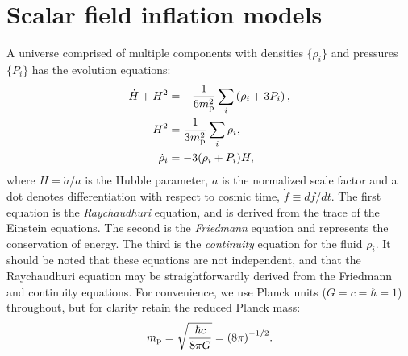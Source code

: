 \section{Scalar field inflation models}
\label{sec:Scalar_field_inflation_models}
%
A universe comprised of multiple components  with densities
$\{\rho_i\}$ and pressures $\{P_i\}$ has the evolution equations:
%
\begin{align}
  \dot{H}+H^2 &= 
  -\frac{1}{6m_{\mathrm{p}}^2}\sum\limits_i\left( \rho_i + 3P_i\right), 
  \label{eqn:Raychaudhuri_rho}
  \\
  H^2 &= 
  \frac{1}{3m_{\mathrm{p}}^2}\sum\limits_i \rho_i, 
  \\
  \dot{\rho}_i 
  &= -3(\rho_i + P_i)H,  
  \label{eqn:conservation}
\end{align}
%
where $H=\dot{a}/a$ is the Hubble parameter, $a$ is the normalized scale factor and a dot denotes differentiation with respect to cosmic time, $\dot{f}\equiv df/dt$. The first equation is the {\em Raychaudhuri\/} equation, and is derived from the trace of the Einstein equations. The second is the {\em Friedmann\/} equation and represents the conservation of energy. The third is the {\em continuity\/} equation for the fluid $\rho_i$. It should be noted that these equations are not independent, and that the Raychaudhuri equation may be straightforwardly derived from the Friedmann and continuity equations.  For convenience, we use Planck units ($G=c=\hbar=1$) throughout, but for clarity retain the reduced Planck mass: 
%
\[m_{\mathrm{p}} = \sqrt{\frac{\hbar c}{8\pi G}} = {(8\pi)}^{-1/2}.\]  
%


